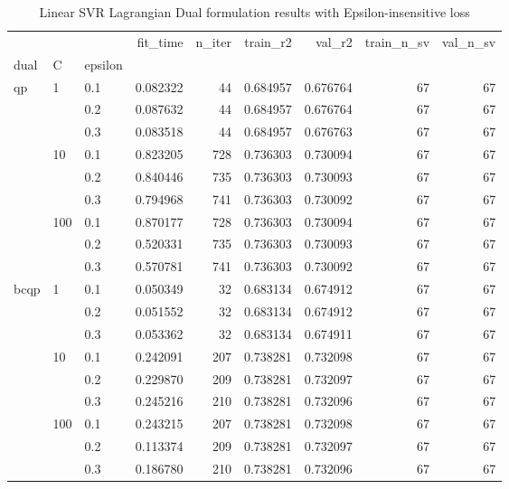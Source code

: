 \begin{table}[H]
\centering
\caption{Linear SVR Lagrangian Dual formulation results with Epsilon-insensitive loss}
\label{linear_lagrangian_dual_svr_cv_results}
\begin{tabular}{lllrrrrrr}
\toprule
     &     &     &  fit\_time &  n\_iter &  train\_r2 &    val\_r2 &  train\_n\_sv &  val\_n\_sv \\
dual & C & epsilon &           &         &           &           &             &           \\
\midrule
qp & 1   & 0.1 &  0.082322 &      44 &  0.684957 &  0.676764 &          67 &        67 \\
     &     & 0.2 &  0.087632 &      44 &  0.684957 &  0.676764 &          67 &        67 \\
     &     & 0.3 &  0.083518 &      44 &  0.684957 &  0.676763 &          67 &        67 \\
     & 10  & 0.1 &  0.823205 &     728 &  0.736303 &  0.730094 &          67 &        67 \\
     &     & 0.2 &  0.840446 &     735 &  0.736303 &  0.730093 &          67 &        67 \\
     &     & 0.3 &  0.794968 &     741 &  0.736303 &  0.730092 &          67 &        67 \\
     & 100 & 0.1 &  0.870177 &     728 &  0.736303 &  0.730094 &          67 &        67 \\
     &     & 0.2 &  0.520331 &     735 &  0.736303 &  0.730093 &          67 &        67 \\
     &     & 0.3 &  0.570781 &     741 &  0.736303 &  0.730092 &          67 &        67 \\
bcqp & 1   & 0.1 &  0.050349 &      32 &  0.683134 &  0.674912 &          67 &        67 \\
     &     & 0.2 &  0.051552 &      32 &  0.683134 &  0.674912 &          67 &        67 \\
     &     & 0.3 &  0.053362 &      32 &  0.683134 &  0.674911 &          67 &        67 \\
     & 10  & 0.1 &  0.242091 &     207 &  0.738281 &  0.732098 &          67 &        67 \\
     &     & 0.2 &  0.229870 &     209 &  0.738281 &  0.732097 &          67 &        67 \\
     &     & 0.3 &  0.245216 &     210 &  0.738281 &  0.732096 &          67 &        67 \\
     & 100 & 0.1 &  0.243215 &     207 &  0.738281 &  0.732098 &          67 &        67 \\
     &     & 0.2 &  0.113374 &     209 &  0.738281 &  0.732097 &          67 &        67 \\
     &     & 0.3 &  0.186780 &     210 &  0.738281 &  0.732096 &          67 &        67 \\
\bottomrule
\end{tabular}
\end{table}
